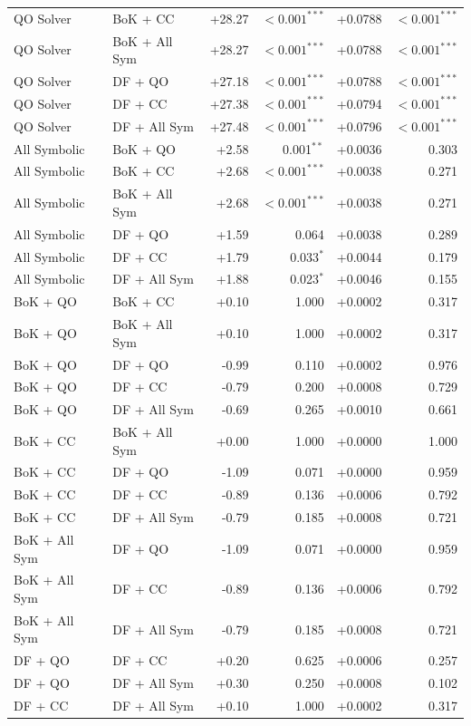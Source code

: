 \begin{table}[!tbh]
{\begin{tabular}{llrrrr}
QO Solver & BoK + CC & +28.27 & $<\!0.001^{***}$ & +0.0788 & $<\!0.001^{***}$ \\
QO Solver & BoK + All Sym & +28.27 & $<\!0.001^{***}$ & +0.0788 & $<\!0.001^{***}$ \\
QO Solver & DF + QO & +27.18 & $<\!0.001^{***}$ & +0.0788 & $<\!0.001^{***}$ \\
QO Solver & DF + CC & +27.38 & $<\!0.001^{***}$ & +0.0794 & $<\!0.001^{***}$ \\
QO Solver & DF + All Sym & +27.48 & $<\!0.001^{***}$ & +0.0796 & $<\!0.001^{***}$ \\
All Symbolic & BoK + QO & +2.58 & 0.001$^{**}$ & +0.0036 & 0.303 \\
All Symbolic & BoK + CC & +2.68 & $<\!0.001^{***}$ & +0.0038 & 0.271 \\
All Symbolic & BoK + All Sym & +2.68 & $<\!0.001^{***}$ & +0.0038 & 0.271 \\
All Symbolic & DF + QO & +1.59 & 0.064 & +0.0038 & 0.289 \\
All Symbolic & DF + CC & +1.79 & 0.033$^{*}$ & +0.0044 & 0.179 \\
All Symbolic & DF + All Sym & +1.88 & 0.023$^{*}$ & +0.0046 & 0.155 \\
BoK + QO & BoK + CC & +0.10 & 1.000 & +0.0002 & 0.317 \\
BoK + QO & BoK + All Sym & +0.10 & 1.000 & +0.0002 & 0.317 \\
BoK + QO & DF + QO & -0.99 & 0.110 & +0.0002 & 0.976 \\
BoK + QO & DF + CC & -0.79 & 0.200 & +0.0008 & 0.729 \\
BoK + QO & DF + All Sym & -0.69 & 0.265 & +0.0010 & 0.661 \\
BoK + CC & BoK + All Sym & +0.00 & 1.000 & +0.0000 & 1.000 \\
BoK + CC & DF + QO & -1.09 & 0.071 & +0.0000 & 0.959 \\
BoK + CC & DF + CC & -0.89 & 0.136 & +0.0006 & 0.792 \\
BoK + CC & DF + All Sym & -0.79 & 0.185 & +0.0008 & 0.721 \\
BoK + All Sym & DF + QO & -1.09 & 0.071 & +0.0000 & 0.959 \\
BoK + All Sym & DF + CC & -0.89 & 0.136 & +0.0006 & 0.792 \\
BoK + All Sym & DF + All Sym & -0.79 & 0.185 & +0.0008 & 0.721 \\
DF + QO & DF + CC & +0.20 & 0.625 & +0.0006 & 0.257 \\
DF + QO & DF + All Sym & +0.30 & 0.250 & +0.0008 & 0.102 \\
DF + CC & DF + All Sym & +0.10 & 1.000 & +0.0002 & 0.317 \\
\bottomrule
\end{tabular}%
}
\end{table}
